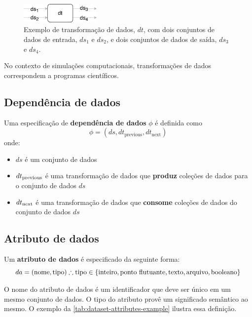 \begin{figure}[htb]
    \centering
    \includegraphics[width=0.35\textwidth]{img/example-data-transformation}
    \caption[Exemplo de transformação de dados]{Exemplo de transformação de dados, \( dt \), com dois conjuntos de dados de entrada, \( ds_1 \) e \( ds_2 \), e dois conjuntos de dados de saída, \( ds_3 \) e \( ds_4 \).}%
    \label{fig:example-transformation}
\end{figure}

No contexto de simulações computacionais, transformações de dados correspondem a programas científicos.

\subsection{Dependência de dados}

Uma especificação de \textbf{dependência de dados} \( \phi \) é definida como \[ \phi = (ds, dt_{\textrm{previous}}, dt_{\textrm{next}}) \] onde:
\begin{itemize}
    \item \( ds \) é um conjunto de dados
    \item \( dt_{\textup{previous}} \) é uma transformação de dados que {\bf produz} coleções de dados para o conjunto de dados \( ds \)
    \item \( dt_{\textup{next}} \) é uma transformação de dados que {\bf consome} coleções de dados do conjunto de dados \( ds \)
\end{itemize}

\subsection{Atributo de dados}

Um \textbf{atributo de dados} é especificado da seguinte forma: \[ da = (\textrm{nome},\textrm{tipo}) \therefore \textrm{tipo} \in \{\textup{inteiro}, \textup{ponto flutuante}, \textup{texto}, \textup{arquivo}, \textup{booleano}\} \]

O nome do atributo de dados é um identificador que deve ser único em um mesmo conjunto de dados. O tipo do atributo provê um significado semântico ao mesmo. O exemplo da \autoref{tab:dataset-attributes-example} ilustra essa definição.

